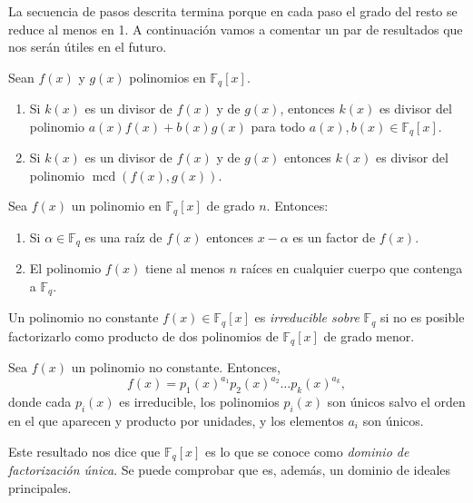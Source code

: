 La secuencia de pasos descrita termina porque en cada paso el grado del resto se reduce al menos en 1.
A continuación vamos a comentar un par de resultados que nos serán útiles en el futuro.

\begin{proposition}
  Sean \(f(x)\) y \(g(x)\) polinomios en \(\mathbb F_q[x]\).
  \begin{enumerate}
    \item Si \(k(x)\) es un divisor de \(f(x)\) y de \(g(x)\), entonces \(k(x)\) es divisor del polinomio \(a(x)f(x) + b(x)g(x)\) para todo \(a(x), b(x) \in \mathbb F_q[x]\).
    \item Si \(k(x)\) es un divisor de \(f(x)\) y de \(g(x)\) entonces \(k(x)\) es divisor del polinomio \(\operatorname{mcd}(f(x), g(x))\).
  \end{enumerate}
\end{proposition}

\begin{proposition}
  \label{prop:raices-factores-pol-Fq}
  Sea \(f(x)\) un polinomio en \(\mathbb F_q[x]\) de grado \(n\). 
  Entonces: 
  \begin{enumerate}
    \item Si \(\alpha \in \mathbb F_q\) es una raíz de \(f(x)\) entonces \(x - \alpha\) es un factor de \(f(x)\).
    \item El polinomio \(f(x)\) tiene al menos \(n\) raíces en cualquier cuerpo que contenga a \(\mathbb F_q\).
  \end{enumerate}
\end{proposition}

Un polinomio no constante \(f(x) \in \mathbb F_q[x]\) es \textit{irreducible sobre} \(\mathbb F_q\) si no es posible factorizarlo como producto de dos polinomios de \(\mathbb F_q[x]\) de grado menor.
\begin{theorem}
  Sea \(f(x)\) un polinomio no constante. Entonces, 
  \[
    f(x) = p_1(x)^{a_1}p_2(x)^{a_2}\dots p_k(x)^{a_k},
  \]
  donde cada \(p_i(x)\) es irreducible, los polinomios \(p_i(x)\) son únicos salvo el orden en el que aparecen y producto por unidades, y los elementos \(a_i\) son únicos.
\end{theorem}
Este resultado nos dice que \(\mathbb F_q[x]\) es lo que se conoce como \textit{dominio de factorización única}.
Se puede comprobar que es, además, un dominio de ideales principales.



